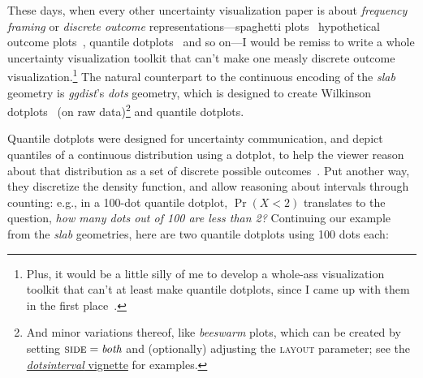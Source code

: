\documentclass[journal]{vgtc}                     %
\begin{document}
These days, when every other uncertainty visualization paper is about \textit{frequency framing} or \textit{discrete outcome} representations---spaghetti plots~\cite{cox2013visualizing,liu2018visualizing} hypothetical outcome plots~\cite{hullman2015hypothetical,kale2018hypothetical}, quantile dotplots~\cite{kay2016ish,fernandes2018uncertainty} and so on---I would be remiss to write a whole uncertainty visualization toolkit that can't make one measly discrete outcome visualization.\footnote{Plus, it would be a little silly of me to develop a whole-ass visualization toolkit that can't at least make quantile dotplots, since I came up with them in the first place~\cite{kay2016ish}.} The natural counterpart to the continuous encoding of the \textit{slab} geometry is \textit{ggdist}'s \textit{dots} geometry, which is designed to create Wilkinson dotplots~\cite{wilkinson1999dot} (on raw data)\footnote{And minor variations thereof, like \textit{beeswarm} plots, which can be created by setting $\textsc{side} = \textit{both}$ and (optionally) adjusting the \textsc{layout} parameter; see the \href{https://mjskay.github.io/ggdist/articles/dotsinterval.html}{\textit{dotsinterval} vignette} for examples.} and quantile dotplots.

Quantile dotplots were designed for uncertainty communication, and depict quantiles of a continuous distribution using a dotplot, to help the viewer reason about that distribution as a set of discrete possible outcomes~\cite{kay2016ish}. Put another way, they discretize the density function, and allow reasoning about intervals through counting: e.g., in a 100-dot quantile dotplot, $\Pr(X < 2)$ translates to the question, \textit{how many dots out of 100 are less than 2?} Continuing our example from the \textit{slab} geometries, here are two quantile dotplots using 100 dots each:
\end{document}
